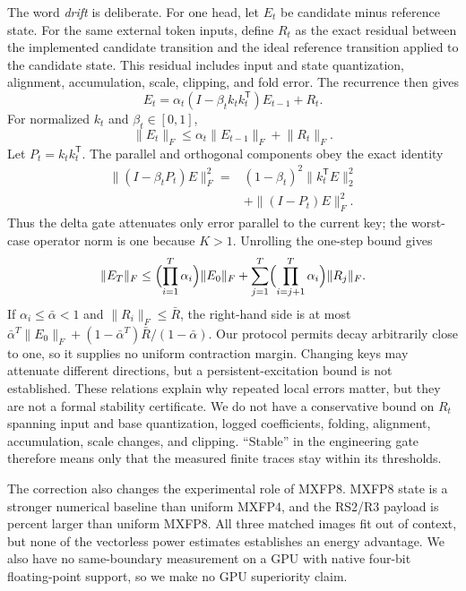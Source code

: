 \documentclass[conference]{IEEEtran}
\begin{document}
The word \emph{drift} is deliberate. For one head, let $E_t$ be candidate minus
reference state. For the same external token inputs, define $R_t$ as the exact
residual between the implemented candidate transition and the ideal reference
transition applied to the candidate state. This residual includes input and
state quantization, alignment, accumulation, scale, clipping, and fold error.
The recurrence then gives
\begin{equation}
E_t=\alpha_t(I-\beta_t k_tk_t^{\mathsf T})E_{t-1}+R_t.
\end{equation}
For normalized $k_t$ and $\beta_t\in[0,1]$,
\begin{equation}
\lVert E_t\rVert_F\leq
\alpha_t\lVert E_{t-1}\rVert_F+\lVert R_t\rVert_F.
\end{equation}
Let $P_t=k_tk_t^{\mathsf T}$. The parallel and orthogonal components obey
the exact identity
\begin{equation}
\begin{split}
\lVert(I-\beta_tP_t)E\rVert_F^2={}&
(1-\beta_t)^2\lVert k_t^{\mathsf T}E\rVert_2^2\\
&+\lVert(I-P_t)E\rVert_F^2.
\end{split}
\end{equation}
Thus the delta gate attenuates only error parallel to the current key; the
worst-case operator norm is one because $K>1$. Unrolling the one-step bound
gives
\begin{equation}
\lVert E_T\rVert_F\leq
\Bigl(\prod_{i=1}^{T}\alpha_i\Bigr)\lVert E_0\rVert_F+
\sum_{j=1}^{T}\Bigl(\prod_{i=j+1}^{T}\alpha_i\Bigr)\lVert R_j\rVert_F.
\end{equation}
If $\alpha_i\leq\bar\alpha<1$ and $\lVert R_i\rVert_F\leq\bar R$, the
right-hand side is at most
$\bar\alpha^T\lVert E_0\rVert_F+
(1-\bar\alpha^T)\bar R/(1-\bar\alpha)$.
Our protocol permits decay arbitrarily close to one, so it supplies no uniform
contraction margin. Changing keys may attenuate different directions, but a
persistent-excitation bound is not established. These relations explain why
repeated local errors matter, but they are not a formal stability certificate. We do
not have a conservative bound on $R_t$ spanning
input and base quantization, logged coefficients, folding, alignment,
accumulation, scale changes, and clipping. ``Stable'' in the engineering gate
therefore means only that the measured finite traces stay within its thresholds.

The correction also changes the experimental role of MXFP8. MXFP8 state is a
stronger numerical baseline than uniform MXFP4, and the RS2/R3 payload is
\RsTwoStatePercentAboveMxfpEight{} percent larger than uniform MXFP8. All three
matched images fit out of context, but none of the vectorless power estimates
establishes an energy advantage. We also have no same-boundary measurement on
a GPU with native four-bit floating-point support, so we make no GPU
superiority claim.
\end{document}
